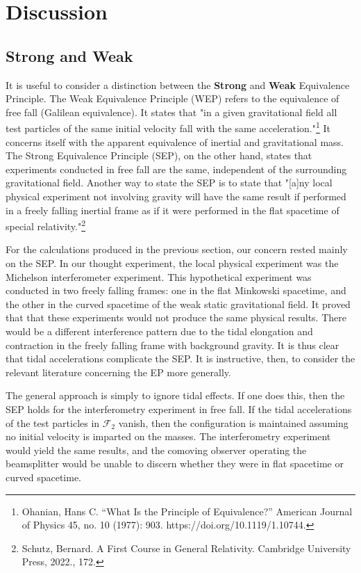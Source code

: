\documentclass[11pt]{article}
\begin{document}
\section{Discussion}

\subsection{Strong and Weak}

It is useful to consider a distinction between the \textbf{Strong} and \textbf{Weak} Equivalence Principle. The Weak Equivalence Principle (WEP) refers to the equivalence of free fall (Galilean equivalence). It states that "in a given gravitational field all test particles of the same initial velocity fall with the same acceleration."\footnote{Ohanian, Hans C. “What Is the Principle of Equivalence?” American Journal of Physics 45, no. 10 (1977): 903. https://doi.org/10.1119/1.10744.} It concerns itself with the apparent equivalence of inertial and gravitational mass. The Strong Equivalence Principle (SEP), on the other hand, states that experiments conducted in free fall are the same, independent of the surrounding gravitational field. Another way to state the SEP is to state that "[a]ny local physical experiment not involving gravity will have the same result if performed in a freely falling inertial frame as if it were performed in the flat spacetime of special relativity."\footnote{Schutz, Bernard. A First Course in General Relativity. Cambridge University Press, 2022., 172.}

For the calculations produced in the previous section, our concern rested mainly on the SEP. In our thought experiment, the local physical experiment was the Michelson interferometer experiment. This hypothetical experiment was conducted in two freely falling frames: one in the flat Minkowski spacetime, and the other in the curved spacetime of the weak static gravitational field. It proved that that these experiments would not produce the same physical results. There would be a different interference pattern due to the tidal elongation and contraction in the freely falling frame with background gravity. It is thus clear that tidal accelerations complicate the SEP. It is instructive, then, to consider the relevant literature concerning the EP more generally.

The general approach is simply to ignore tidal effects. If one does this, then the SEP holds for the interferometry experiment in free fall. If the tidal accelerations of the test particles in $\mathcal F_2$ vanish, then the configuration is maintained assuming no initial velocity is imparted on the masses. The interferometry experiment would yield the same results, and the comoving observer operating the beamsplitter would be unable to discern whether they were in flat spacetime or curved spacetime. 
\end{document}
